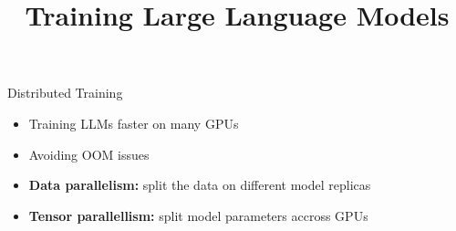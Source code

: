 



\newcommand{\learninggoals}{
\item Learn about different techniques to reduce compute and memory
\item Learn about distributed training with data/tensor parallelism
\item Learn about Flash Attention
}
\def\myblue#1{\textcolor{texblue}{#1}}

\title{Training Large Language Models}
\date{}







\begin{vbframe}{Distributed Training}

\vfill

\begin{itemize}
 	\item Training LLMs faster on many GPUs
 	\item Avoiding OOM issues
	\item \textbf{Data parallelism:} split the data on different model replicas
	\item \textbf{Tensor parallellism:} split model parameters accross GPUs
\end{itemize}

\vfill

\end{vbframe}

